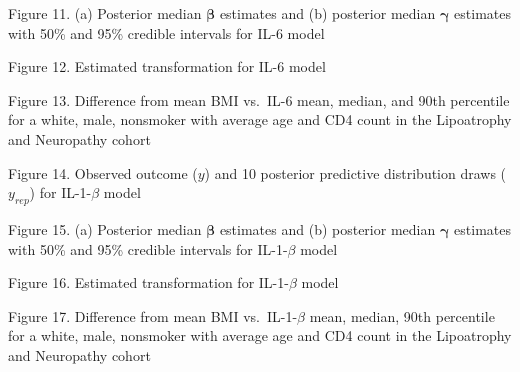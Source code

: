 \documentclass[
]{article}
\begin{document}
Figure 11. (a) Posterior median \(\boldsymbol{\beta}\) estimates and (b) posterior median \(\boldsymbol{\gamma}\) estimates with 50\% and 95\% credible intervals for IL-6 model

Figure 12. Estimated transformation for IL-6 model

Figure 13. Difference from mean BMI vs.~IL-6 mean, median, and 90th percentile for a white, male, nonsmoker with average age and CD4 count in the Lipoatrophy and Neuropathy cohort

Figure 14. Observed outcome (\(y\)) and 10 posterior predictive distribution draws (\(y_{rep}\)) for IL-1-\(\beta\) model

Figure 15. (a) Posterior median \(\boldsymbol{\beta}\) estimates and (b) posterior median \(\boldsymbol{\gamma}\) estimates with 50\% and 95\% credible intervals for IL-1-\(\beta\) model

Figure 16. Estimated transformation for IL-1-\(\beta\) model

Figure 17. Difference from mean BMI vs.~IL-1-\(\beta\) mean, median, 90th percentile for a white, male, nonsmoker with average age and CD4 count in the Lipoatrophy and Neuropathy cohort
\end{document}
